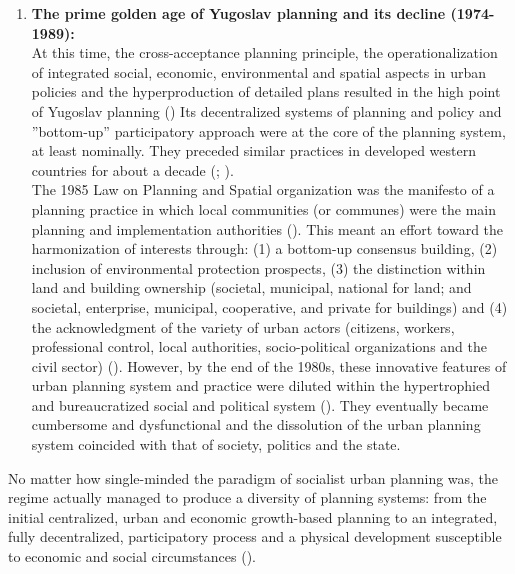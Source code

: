 \documentclass[11pt]{report}
\begin{document}
{{{{\begin{enumerate}
\item \textbf{The prime golden age of Yugoslav planning and its decline (1974-1989):}
\\
At this  time, the cross-acceptance  planning  principle, the  operationalization  of  integrated social,  economic, environmental and spatial aspects in urban policies and the hyperproduction of detailed plans resulted in the high point of Yugoslav planning (\href{Nedovic}{\citealt{nedovic-budic_mornings_2011}})
Its decentralized systems of planning and policy and ”bottom-up” participatory approach were at the core of the planning system, at least nominally. They preceded similar practices in developed western countries for about a decade (\href{Cullingworth}{\citealt{cullingworth_planning_1997}}; \href{Vujosevic} {\citealt{vujosevic_collapse_2010}}).
\\

The 1985 Law on Planning and Spatial organization was the manifesto of a planning practice in which local communities (or communes) were the main planning and implementation authorities (\href{Vujosevic}{\citealt{vujosevic_planning_2006}}). This meant an effort toward the harmonization of interests through: (1) a bottom-up consensus building, (2) inclusion of environmental protection prospects, (3) the distinction within land and building ownership (societal, municipal, national for land; and societal, enterprise, municipal, cooperative, and private for buildings) and (4) the acknowledgment of the variety of urban actors (citizens, workers, professional control, local authorities, socio-political organizations and the civil sector) (\href{Nedovic}{\citealt{nedovic-budic_adjustment_2001}}).
However, by the end of the 1980s, these innovative features of urban planning system and practice were diluted within the hypertrophied and bureaucratized social and political system (\href{Peric}{\citealt{peric_evolution_2016}}). They eventually became cumbersome and dysfunctional and the dissolution of the urban planning system coincided with that of society, politics and the state.
\end{enumerate}

No matter how single-minded the paradigm of socialist urban planning was, the regime actually managed to produce a diversity of planning systems:  from the initial centralized, urban and economic growth-based planning to an integrated, fully decentralized, participatory process and a physical development susceptible to economic and social circumstances (\href{Haussemann}{\citealt{haussermann_socialist_1996}}).

}}}}
\end{document}
